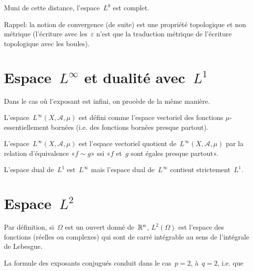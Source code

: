\begin{theoreme}
Muni de cette distance, l'espace~$L^0$ est complet.
\end{theoreme}

\medskip
Rappel: la notion de convergence (de suite) est une propriété topologique et non
métrique (l'écriture avec les~$\varepsilon$ n'est que la traduction métrique
de l'écriture topologique avec les boules).

\medskip
\section{Espace~$L^\infty$ et dualité avec~$L^1$}
Dans le cas où l'exposant est infini, on procède de la même manière.

\medskip
L'espace~$L^\infty(X, \mathcal{A}, \mu)$ est défini comme l'espace vectoriel des fonctions
$\mu$-essentiellement bornées (i.e. des fonctions bornées presque partout).

L'espace~$L^\infty(X, \mathcal{A}, \mu)$ est l'espace vectoriel quotient de~$L^\infty(X, \mathcal{A}, \mu)$
par la relation d'équivalence «$f \sim g$» ssi «$f$ et~$g$ sont égales presque partout».

\begin{theoreme}
L'espace dual de~$L^1$ est~$L^{\infty}$ mais l'espace dual de~$L^{\infty}$ contient strictement~$L^1$.
\end{theoreme}

\medskip
\section{Espace~$L^2$}

Par définition, si~$\Omega$ est un ouvert donné de~$\mathbb R^n$, $L^2(\Omega)$ est l'espace des
fonctions (réelles ou complexes) qui sont de carré intégrable au sens de l'intégrale de Lebesgue.

\medskip
\begin{theoreme}
\end{theoreme}

\medskip
La formule des exposants conjugués conduit dans le cas~$p=2$, à~$q=2$, i.e.
que 


